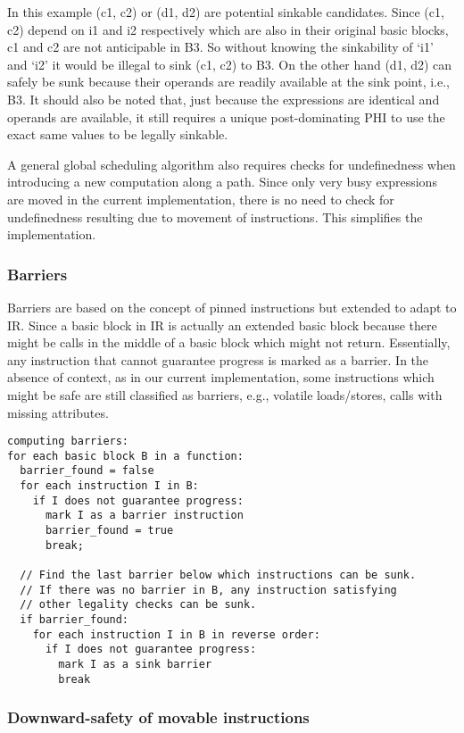 \documentclass[acmlarge,review,anonymous]{acmart}\settopmatter{printfolios=true}
\begin{document}
In this example (c1, c2) or (d1, d2) are potential sinkable candidates. Since
(c1, c2) depend on i1 and i2 respectively which are also in their original basic
blocks, c1 and c2 are not anticipable in B3. So without knowing the sinkability
of `i1' and `i2' it would be illegal to sink (c1, c2) to B3. On the other hand
(d1, d2) can safely be sunk because their operands are readily available at the
sink point, i.e., B3. It should also be noted that, just because the expressions
are identical and operands are available, it still requires a unique
post-dominating PHI to use the exact same values to be legally sinkable.

A general global scheduling algorithm also requires checks for undefinedness
when introducing a new computation along a path. Since only very busy
expressions are moved in the current implementation, there is no need to check
for undefinedness resulting due to movement of instructions. This simplifies the
implementation.

\subsubsection{Barriers}
Barriers are based on the concept of pinned instructions \cite{click1995global}
but extended to adapt to \LLVM{} IR. Since a basic block in \LLVM{} IR is
actually an extended basic block because there might be calls in the middle of a
basic block which might not return. Essentially, any instruction that cannot
guarantee progress is marked as a barrier. In the absence of context, as in our
current implementation, some instructions which might be safe are still
classified as barriers, e.g., volatile loads/stores, calls with missing
attributes.

\begin{verbatim}
computing barriers:
for each basic block B in a function:
  barrier_found = false
  for each instruction I in B:
    if I does not guarantee progress:
      mark I as a barrier instruction
      barrier_found = true
      break;

  // Find the last barrier below which instructions can be sunk.
  // If there was no barrier in B, any instruction satisfying
  // other legality checks can be sunk.
  if barrier_found:
    for each instruction I in B in reverse order:
      if I does not guarantee progress:
        mark I as a sink barrier
        break
\end{verbatim}

\subsubsection{Downward-safety of movable instructions}
\end{document}
